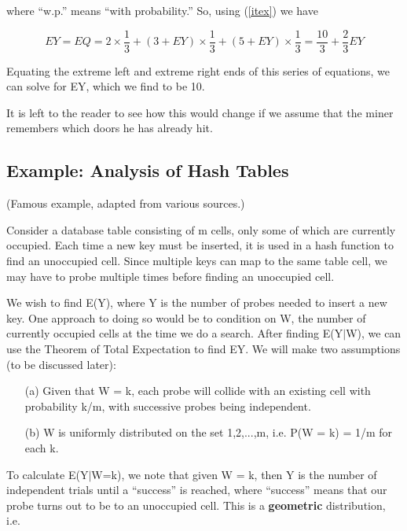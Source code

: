 \documentclass[11pt]{article}
\begin{document}
where ``w.p.'' means ``with probability.'' So, using (\ref{itex}) we have

\begin{equation}
EY=EQ=2\times \frac{1}{3}+(3+EY)\times \frac{1}{3}+(5+EY)\times \frac{1}{3}=\frac{10}{3}+\frac{2}{3}EY
\end{equation}

Equating the extreme left and extreme right ends of this series of equations,
we can solve for EY, which we find to be 10.


It is left to the reader to see how this would change if we assume that the
miner remembers which doors he has already hit.

\subsection{Example:  Analysis of Hash Tables}

(Famous example, adapted from various sources.)

Consider a database table consisting of m cells, only some of which are
currently occupied. Each time a new key must be inserted, it is used in
a hash function to find an unoccupied cell. Since multiple keys can map to
the same table cell, we may have to probe multiple times before finding
an unoccupied cell.

We wish to find E(Y), where Y is the number of probes needed to insert a
new key.  One approach to doing so would be to condition on W, the
number of currently occupied cells at the time we do a search.  After
finding E(Y$|$W), we can use the Theorem of Total Expectation to find
EY.  We will make two assumptions (to be discussed later):

\begin{itemize}

\item [(a)] Given that W = k, each probe will collide with an existing
cell with probability k/m, with successive probes being independent.

\item [(b)] W is uniformly distributed on the set 1,2,...,m, i.e. P(W =
k) = 1/m for each k.

\end{itemize}

To calculate E(Y$|$W=k), we note that given W = k, then Y is the
number of independent trials until a ``success'' is reached, where
``success'' means that our probe turns out to be to an unoccupied cell.
This is a {\bf geometric} distribution, i.e.
\end{document}
